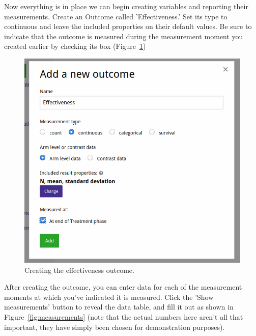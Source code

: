 \documentclass[12pt]{article}
\begin{document}
Now everything is in place we can begin creating variables and reporting their measurements. Create an Outcome called 'Effectiveness.' Set its type to continuous and leave the included properties on their default values. Be sure to indicate that the outcome is measured during the measurement moment you created earlier by checking its box (Figure~\ref{fig:effectiveness})

\begin{figure}[!htbp]
  \centering
  \includegraphics[width=\textwidth]{img/effectiveness.png}
  \caption{Creating the effectiveness outcome.}
\label{fig:effectiveness}
\end{figure}

After creating the outcome, you can enter data for each of the measurement moments at which you've indicated it is measured. Click the 'Show measurements' button to reveal the data table, and fill it out as shown in Figure~\ref{fig:measurements} (note that the actual numbers here aren't all that important, they have simply been chosen for demonstration purposes).
\end{document}

